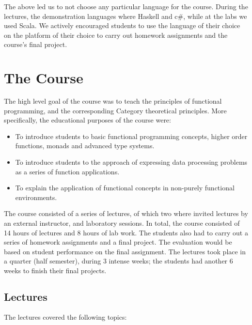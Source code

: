 \documentclass[conference]{IEEEtran}
\begin{document}
The above led us to not choose any particular language for the course.  During
the lectures, the demonstration languages where Haskell and {\sc c\#}, while at
the labs we used Scala. We actively encouraged students to use the language of
their choice on the platform of their choice to carry out homework assignments
and the course's final project.

\section{The Course}

The high level goal of the course was to teach the principles of functional
programming, and the corresponding Category theoretical principles. 
More specifically, the educational purposes of the course were:

\begin{itemize}

  \item To introduce students to basic functional programming concepts,
    higher order functions, monads and advanced type systems.

  \item To introduce students to the approach of expressing data processing
    problems as a series of function applications.

  \item To explain the application of functional concepts in non-purely
    functional environments.

\end{itemize}

The course consisted of a series of lectures, of which two where invited
lectures by an external instructor, and laboratory sessions. In total, the
course consisted of 14 hours of lectures and 8 hours of lab work.
The students
also had to carry out a series of homework assignments and a final project.
The evaluation would be based on student performance on the final assignment. 
The lectures took place in a quarter (half semester), during 3 intense 
weeks; the students had another 6 weeks to finish their final projects.

\subsection{Lectures}

The lectures covered the following topics:
\end{document}
